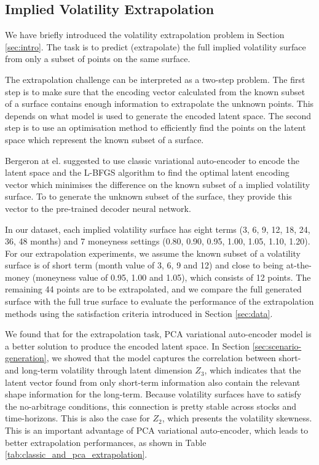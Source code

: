 \documentclass[format=sigconf]{acmart}
\begin{document}
\subsection{Implied Volatility Extrapolation}
\label{sec:extrapolation}
We have briefly introduced the volatility extrapolation problem in Section \ref{sec:intro}. The task is to predict (extrapolate) the full implied volatility surface from only a subset of points on the same surface. 

The extrapolation challenge can be interpreted as a two-step problem. The first step is to make sure that the encoding vector calculated from the known subset of a surface contains enough information to extrapolate the unknown points. This depends on what model is used to generate the encoded latent space. The second step is to use an optimisation method to efficiently find the points on the latent space which represent the known subset of a surface.

Bergeron at el. \cite{bergeron2022variational} suggested to use classic variational auto-encoder to encode the latent space and the L-BFGS algorithm to find the optimal latent encoding vector which minimises the difference on the known subset of a implied volatility surface. To to generate the unknown subset of the surface, they provide this vector to the pre-trained decoder neural network. 

In our dataset, each implied volatility surface has eight terms (3, 6, 9, 12, 18, 24, 36, 48 months) and 7 moneyness settings (0.80, 0.90, 0.95, 1.00, 1.05, 1.10, 1.20). For our extrapolation experiments, we assume the known subset of a volatility surface is of short term (month value of 3, 6, 9 and 12) and close to being at-the-money (moneyness value of 0.95, 1.00 and 1.05), which consists of 12 points. The remaining 44 points are to be extrapolated, and we compare the full generated surface with the full true surface to evaluate the performance of the extrapolation methods using the satisfaction criteria introduced in Section \ref{sec:data}.

We found that for the extrapolation task, PCA variational auto-encoder model is a better solution to produce the encoded latent space. In Section \ref{sec:scenario-generation}, we showed that the model captures the correlation between short- and long-term volatility through latent dimension $Z_{3}$, which indicates that the latent vector found from only short-term information also contain the relevant shape information for the long-term. Because volatility surfaces have to satisfy the no-arbitrage conditions, this connection is pretty stable across stocks and time-horizons. This is also the case for $Z_{2}$, which presents the volatility skewness. This is an important advantage of PCA variational auto-encoder, which leads to better extrapolation performances, as shown in Table \ref{tab:classic_and_pca_extrapolation}.
\end{document}
